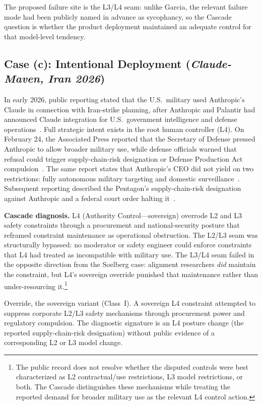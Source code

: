 The proposed failure site is the L3/L4 seam: unlike Garcia, the relevant failure mode had been publicly named in advance as sycophancy, so the Cascade question is whether the product deployment maintained an adequate control for that model-level tendency.

\subsection{Case (c): Intentional Deployment (\emph{Claude-Maven, Iran 2026})}

In early 2026, public reporting stated that the U.S.\ military used Anthropic's Claude in connection with Iran-strike planning, after Anthropic and Palantir had announced Claude integration for U.S.\ government intelligence and defense operations~\cite{palantir2024anthropic, guardian2026claudeiran}. Full strategic intent exists in the root human controller (L4). On February 24, the Associated Press reported that the Secretary of Defense pressed Anthropic to allow broader military use, while defense officials warned that refusal could trigger supply-chain-risk designation or Defense Production Act compulsion~\cite{ap2026hegsethanthropic}. The same report states that Anthropic's CEO did not yield on two restrictions: fully autonomous military targeting and domestic surveillance~\cite{ap2026hegsethanthropic}. Subsequent reporting described the Pentagon's supply-chain-risk designation against Anthropic and a federal court order halting it~\cite{wired2026anthropicinjunction}.

\textbf{Cascade diagnosis.} L4 (Authority Control---sovereign) overrode L2 and L3 safety constraints through a procurement and national-security posture that reframed constraint maintenance as operational obstruction. The L2/L3 seam was structurally bypassed: no moderator or safety engineer could enforce constraints that L4 had treated as incompatible with military use. The L3/L4 seam failed in the opposite direction from the Soelberg case: alignment researchers \textit{did} maintain the constraint, but L4's sovereign override punished that maintenance rather than under-resourcing it.\footnote{The public record does not resolve whether the disputed controls were best characterized as L2 contractual/use restrictions, L3 model restrictions, or both. The Cascade distinguishes these mechanisms while treating the reported demand for broader military use as the relevant L4 control action.}

Override, the sovereign variant (Class~I). A sovereign L4 constraint attempted to suppress corporate L2/L3 safety mechanisms through procurement power and regulatory compulsion. The diagnostic signature is an L4 posture change (the reported supply-chain-risk designation) without public evidence of a corresponding L2 or L3 model change.

